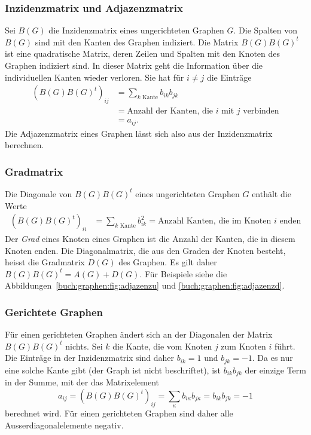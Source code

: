 \subsubsection{Inzidenzmatrix und Adjazenzmatrix}
Sei $B(G)$ die Inzidenzmatrix eines ungerichteten Graphen $G$. 
Die Spalten von $B(G)$ sind mit den Kanten des Graphen indiziert.
Die Matrix $B(G)B(G)^t$ ist eine quadratische Matrix, deren
Zeilen und Spalten mit den Knoten des Graphen indiziert sind.
In dieser Matrix geht die Information über die individuellen
Kanten wieder verloren.
Sie hat für $i\ne j$ die Einträge
\begin{align*}
(B(G)B(G)^t)_{i\!j}
&=
\sum_{\text{$k$ Kante}} b_{ik}b_{jk}
\\
&=\text{Anzahl der Kanten, die $i$ mit $j$ verbinden}
\\
&=a_{i\!j}.
\end{align*}
Die Adjazenzmatrix eines Graphen lässt sich also aus der
Inzidenzmatrix berechnen.

\subsubsection{Gradmatrix}
%
Die Diagonale von $B(G)B(G)^t$ eines ungerichteten Graphen $G$
enthält die Werte
\begin{align}
(B(G)B(G)^t)_{ii}
&=
\sum_{\text{$k$ Kante}} b_{ik}^2
=
\text{Anzahl Kanten, die im Knoten $i$ enden}
\label{buch:graphen:eqn:gradmatrix}
\end{align}
Der {\em Grad} eines Knoten eines Graphen ist die Anzahl der
%
Kanten, die in diesem Knoten enden.
Die Diagonalmatrix, die aus den Graden der Knoten besteht, heisst die
Gradmatrix $D(G)$ des Graphen.
Es gilt daher $B(G)B(G)^t = A(G) + D(G)$.
Für Beispiele siehe die Abbildungen~\ref{buch:graphen:fig:adjazenzu} und
\ref{buch:graphen:fig:adjazenzd}.

\subsubsection{Gerichtete Graphen}
Für einen gerichteten Graphen ändert sich an der Diagonalen
der Matrix $B(G)B(G)^t$ nichts.
Sei $k$ die Kante, die vom Knoten $j$ zum Knoten $i$ führt.
Die Einträge in der Inzidenzmatrix sind daher $b_{ik}=1$ und $b_{jk}=-1$.
Da es nur eine solche Kante gibt (der Graph ist nicht beschriftet),
ist $b_{ik}b_{jk}$ der einzige Term in der Summe, mit der das
Matrixelement
\begin{equation}
a_{i\!j}
=
(B(G)B(G)^t)_{i\!j}
=
\sum_{\kappa} b_{i\kappa}b_{j\kappa}
=
b_{ik}b_{jk}
=
-1
\label{buch:graphen:eqn:ausserdiagonal}
\end{equation}
berechnet wird.
Für einen gerichteten Graphen sind daher alle Ausserdiagonalelemente
negativ.

